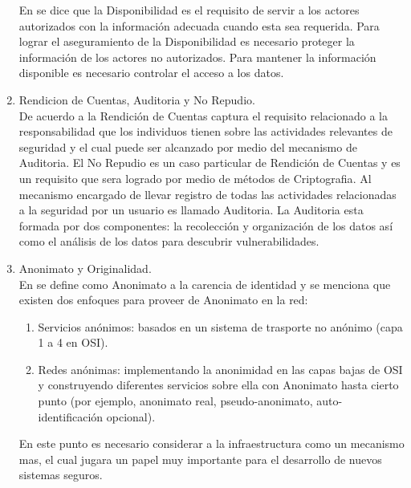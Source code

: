 \documentclass[runningheads,a4paper]{llncs}
\begin{document}
\begin{enumerate}
En \cite{CoSMoIntroduction} se dice que la Disponibilidad es el requisito de servir a los actores autorizados  con la información adecuada cuando esta sea requerida. Para lograr el aseguramiento de la Disponibilidad es necesario proteger la información de los actores no autorizados. Para mantener la información disponible es necesario controlar el acceso a los datos.\\  
	
	\item Rendicion de Cuentas, Auditoria y No Repudio.\\

De acuerdo a \cite{CoSMoIntroduction} la Rendición de Cuentas captura el requisito relacionado a la responsabilidad que los individuos tienen sobre las actividades relevantes de seguridad y el cual puede ser alcanzado por medio del mecanismo de Auditoria. El No Repudio es un caso particular de Rendición de Cuentas  y es un requisito que sera logrado por medio de métodos de \gls{Criptografia}. Al mecanismo encargado de llevar registro de todas las actividades relacionadas a la seguridad por un usuario es llamado Auditoria. La Auditoria esta formada por dos componentes: la recolección y organización de los datos así como el análisis de los datos para descubrir vulnerabilidades.\\

	\item Anonimato y Originalidad.\\
	
En \cite{CoSMoIntroduction} se define como Anonimato a la carencia de identidad y se menciona que existen dos enfoques para proveer de Anonimato en la red:\\

	\begin{enumerate}
		\item Servicios anónimos: basados en un sistema de trasporte no anónimo (capa 1 a 4 en \gls{OSI}).
		\item Redes anónimas: implementando la anonimidad en las capas bajas de \gls{OSI} y construyendo diferentes servicios sobre ella con Anonimato hasta cierto punto (por ejemplo, anonimato real, pseudo-anonimato, auto-identificación opcional).\\
	\end{enumerate}

En este punto es necesario considerar a la infraestructura como un mecanismo mas, el cual jugara un papel muy importante para el desarrollo de nuevos sistemas seguros.\\


\end{enumerate}
\end{document}

